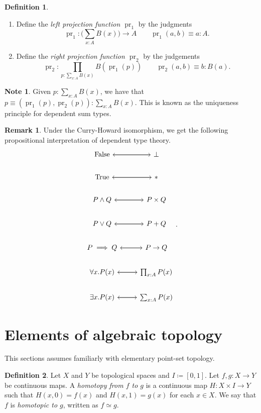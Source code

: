 \documentclass[10pt,letterpaper,cm]{nupset}
\theoremstyle{definition}
\newtheorem*{definition}{Definition}
\newtheorem{note}{Note}
\newtheorem{remark}{Remark}
\newcommand{\1}{\mathbf{1}}
\newcommand{\0}{\vec 0}
\DeclareMathOperator{\pr}{pr}
\begin{document}
\begin{definition} $ $
\begin{enumerate}
\item Define the \textit{left projection function $\pr_1$} by the judgments $$\pr_1 : \big (\sum_{x:A}B(x) \big) \to A  \quad \quad \pr_1(a,b) \equiv a: A.$$
\item Define the \textit{right projection function $\pr_2$} by the judgements  $$ \pr_2 : \prod_{p: \sum_{x:A}B(x)} B(\pr_1(p)) \quad \quad \pr_2(a,b) \equiv b :B(a). $$
\end{enumerate}
\end{definition}

\begin{note}
Given $p: \sum_{x:A} B(x)$, we have that $p\equiv (\pr_1(p), \pr_2(p)) : \sum_{x:A}B(x)$. This is known as the uniqueness principle for dependent sum types.
\end{note}

\begin{remark}
Under the Curry-Howard isomorphism, we get the following propositional interpretation of dependent type theory.
\[
\begin{tikzcd}
\text{False} \arrow[r] & \bot \arrow[l] \\
\text{True} \arrow[r] & \ast \arrow[l] \\
P \land Q \arrow[r] & P\times Q \arrow[l] \\
P\vee Q \arrow[r] & P + Q \arrow[l] \\
P \implies Q \arrow[r] & P \to Q \arrow[l] \\
\forall x.P(x) \arrow[r] & \prod_{x:A}P(x) \arrow[l] \\
\exists x. P(x) \arrow[r] & \sum_{x:A}P(x) \arrow[l]
\end{tikzcd}
.\]
\end{remark}


\section{Elements of algebraic topology}

This sections assumes familiarly with elementary point-set topology.

\begin{definition}
Let $X$ and $Y$ be topological spaces and $I\coloneqq [0,1]$. Let $f,g: X \to Y$ be continuous maps. A \textit{homotopy from $f$ to $g$} is a continuous map $H: X \times I \to Y$ such that $H(x,0) = f(x)$ and $H(x,1) = g(x)$ for each $x\in X$. We say that $f$ is \textit{homotopic to $g$}, written as $f\simeq g$.
\end{definition}
\end{document}
